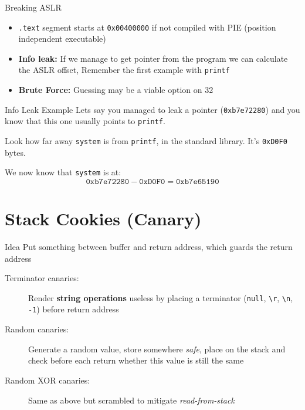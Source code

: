 \documentclass[beamer]{uibk}
\begin{document}
\begin{frame}{Breaking ASLR}
    \begin{itemize}
        \item \texttt{.text} segment starts at \texttt{0x00400000} if not
            compiled with PIE (position independent executable)
        \medskip
        \pause
        \item \textbf{Info leak:} If we manage to get pointer from the program
            we can calculate the ASLR offset, Remember the first example with
            \texttt{printf}
        \medskip
        \item \textbf{Brute Force:} Guessing may be a viable option on
            \SI{32}{\bit}
    \end{itemize}
\end{frame}

\begin{frame}{Info Leak Example}
    Lets say you managed to leak a pointer (\texttt{0xb7e72280}) and you know
    that this one usually points to \texttt{printf}.
    \bigskip

    Look how far away \texttt{system} is from \texttt{printf}, in the standard
    library. It's \texttt{0xD0F0} bytes.
    \bigskip

    We now know that \texttt{system} is at:
    \[ \mathtt{0xb7e72280} - \mathtt{0xD0F0} = \mathtt{0xb7e65190} \]
\end{frame}

\section{Stack Cookies (Canary)}

\begin{frame}{Idea}
    Put something between buffer and return address, which guards the return
    address
    \bigskip
    \pause
    \begin{description}
        \item[Terminator canaries:] Render \textbf{string operations}
            useless by placing a terminator (\texttt{null},
            \texttt{\textbackslash r}, \texttt{\textbackslash n},
            \texttt{-1}) before return address
        \medskip
        \item [Random canaries:] Generate a random value, store somewhere
            \textit{safe}, place on the stack and check before each return
            whether this value is still the same
        \medskip
        \item [Random XOR canaries:] Same as above but scrambled to mitigate
            \textit{read-from-stack}
    \end{description}
\end{frame}
\end{document}
